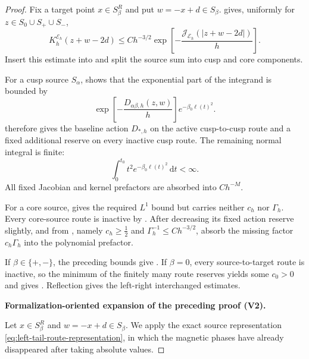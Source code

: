 \documentclass[11pt]{article}
\newcommand{\formalisationparentid}{X}
\newenvironment{formalisationaddition}[1]{\par\medskip\begingroup\color{blue}\def\formalisationparentid{#1}\setcounter{formalizationsublemma}{0}\let\lemma\formalizationsublemma\let\endlemma\endformalizationsublemma
  \def\Eo{\mathcal E_h^\circ}\def\EE{\mathcal E_h}\def\phio{\phi_h^\circ}\def\phih{\phi_h}\def\Ho{H_h^{\rm atom}(v^\circ)}\def\Ha{H_h^{\rm atom}}\def\HL{H_h^{L}}\def\Dh{D_h}\def\Log{\operatorname{Log}}\def\ellh{\ell_h}\def\Gp{G_{p,h}}\def\Ast{A_{*,h}}\def\ahat{\widehat{\mathfrak a}_h}\def\ah{\mathfrak a_h}\def\rh{\widehat\rho_h}\def\deltah{\widehat\delta_h}\def\oldref##1{\textup{(##1)}}\def\interface##1{\par\noindent\textit{Analytical interface used here.} ##1\par}\def\finish{\par\noindent\textit{Conclusion of the formalization-oriented expansion.} }\par\noindent\textbf{Formalization-oriented expansion of the preceding proof (V2).}\par\smallskip
}{\par\endgroup\medskip
}
\newcommand{\dd}{\,\mathrm d}
\newcommand{\cE}{\mathcal E}
\newcommand{\cJ}{\mathcal J}
\begin{document}
\begin{proof}
Fix a target point $x\in S_\beta^R$ and put $w=-x+d\in S_\beta$.   gives, uniformly for
$z\in S_0\cup S_+\cup S_-$,
\[
 K_h^{\cE_h}(z+w-2d)
 \le Ch^{-3/2}
 \exp\left[-\frac{\cJ_{\cE_h}(|z+w-2d|)}h\right].
\]
Insert this estimate into  and
split the source sum into cusp and core components.

For a cusp source $S_\alpha$,  shows that
the exponential part of the integrand is bounded by
\[
 \exp\left[-\frac{D_{\alpha\beta,h}(z,w)}h\right]
 e^{-\beta_0\ell(t)^2}.
\]
 therefore gives the baseline action $D_{*,h}$
on the active cusp-to-cusp route and a fixed additional reserve on every
inactive cusp route.  The remaining normal integral is finite:
\[
 \int_0^{t_0}t^2e^{-\beta_0\ell(t)^2}\dd t<\infty.
\]
All fixed Jacobian and kernel prefactors are absorbed into $Ch^{-M}$.

For a core source,  gives the required
$L^1$ bound but carries neither $c_h$ nor $\Gamma_h$.  Every core-source
route is inactive by .  After decreasing its
fixed action reserve slightly,  and
 from , namely
$c_h\ge\frac12$ and $\Gamma_h^{-1}\le Ch^{-3/2}$, absorb the missing
factor $c_h\Gamma_h$ into the polynomial prefactor.

If $\beta\in\{+,-\}$, the preceding bounds give
.  If $\beta=0$, every source-to-target route is
inactive, so the minimum of the finitely many route reserves yields some
$c_0>0$ and gives .  Reflection gives the
left-right interchanged estimates.

\begin{formalisationaddition}{L8.2}
Let $x\in S_\beta^R$ and $w=-x+d\in S_\beta$. We apply the exact source representation \eqref{eq:left-tail-route-representation}, in which the magnetic phases have already disappeared after taking absolute values.


\end{formalisationaddition}
\end{proof}
\end{document}
